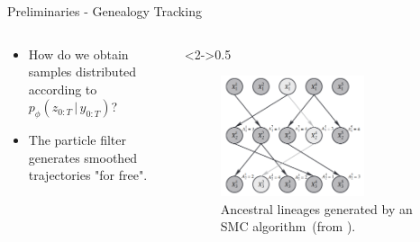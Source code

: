 \documentclass[10pt, aspectratio=1610]{beamer}
\newcommand{\given}{\,|\,}
\begin{document}
    \begin{frame}{Preliminaries - Genealogy Tracking}
      \begin{columns}
        \begin{column}{0.5\textwidth}
          \begin{itemize}
            \item<1-> How do we obtain samples distributed according to $p_\phi(z_{0:T} \given y_{0:T})$?
            \item<2-> The particle filter generates smoothed trajectories "for free".
            \vspace{1cm}
          \end{itemize}          
        \end{column}
        \begin{column}<2->{0.5\textwidth}
          \begin{figure}[htbp]
            \centering
            \includegraphics[width=0.7\textwidth]{figures/genealogy_tracking.png}
            \caption{Ancestral lineages generated by an SMC algorithm~(from \citet{andrieu2010particle}).}
          \end{figure}
        \end{column}
      \end{columns}
    \end{frame}
\end{document}
